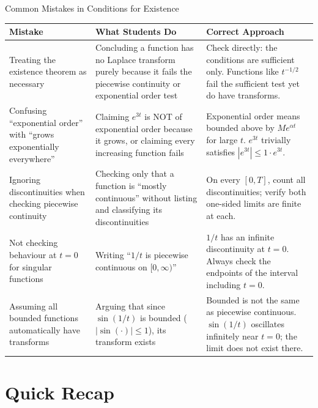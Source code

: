 \documentclass[12pt,a4paper]{article}
\begin{document}
\begin{mistakebox}{Common Mistakes in Conditions for Existence}
\begin{tabular}{@{}p{} p{} p{}@{}}
\toprule
\textbf{Mistake} & \textbf{What Students Do} & \textbf{Correct Approach} \\
\midrule
Treating the existence theorem as necessary &
Concluding a function has no Laplace transform purely because it fails the piecewise continuity
or exponential order test &
Check directly: the conditions are sufficient only.
Functions like $t^{-1/2}$ fail the sufficient test yet do have transforms. \\
\midrule
Confusing ``exponential order'' with ``grows exponentially everywhere'' &
Claiming $e^{3t}$ is NOT of exponential order because it grows, or claiming every
increasing function fails &
Exponential order means bounded above by $Me^{\alpha t}$ for large $t$.
$e^{3t}$ trivially satisfies $|e^{3t}| \leq 1 \cdot e^{3t}$. \\
\midrule
Ignoring discontinuities when checking piecewise continuity &
Checking only that a function is ``mostly continuous'' without listing and classifying its
discontinuities &
On every $[0,T]$, count all discontinuities; verify both one-sided limits are finite at each. \\
\midrule
Not checking behaviour at $t = 0$ for singular functions &
Writing ``$1/t$ is piecewise continuous on $[0,\infty)$'' &
$1/t$ has an infinite discontinuity at $t = 0$.
Always check the endpoints of the interval including $t = 0$. \\
\midrule
Assuming all bounded functions automatically have transforms &
Arguing that since $\sin(1/t)$ is bounded ($|\sin(\cdot)| \leq 1$), its transform exists &
Bounded is not the same as piecewise continuous.
$\sin(1/t)$ oscillates infinitely near $t = 0$; the limit does not exist there. \\
\bottomrule
\end{tabular}
\end{mistakebox}

\section{Quick Recap}
\end{document}
